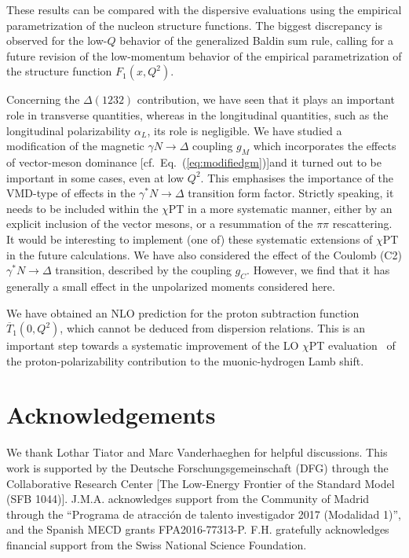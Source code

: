 \documentclass[12pt,preprint,tightenlines,
showpacs,preprintnumbers,amsmath,amssymb,
a4paper,nofootinbib]{revtex4-2}
\def\Eqref#1{Eq.~(\ref{eq:#1})}
\def\ol#1{\overline{#1}}
\begin{document}
These results can be compared with the dispersive evaluations using the  empirical parametrization of the nucleon structure functions. The biggest discrepancy is 
observed for the low-$Q$ behavior of the generalized Baldin sum rule, calling
for a future revision of the low-momentum behavior of the empirical
parametrization of the structure function $F_1(x,Q^2)$.


Concerning the $\Delta(1232)$ contribution, we have seen that it plays an important role in transverse quantities, whereas in the longitudinal quantities, such as the longitudinal polarizability $\alpha_L$, its role is negligible. We have studied a modification of the magnetic $\gamma N \to \Delta$ coupling $g_M$  which 
incorporates the effects of vector-meson dominance 
[cf.\ \Eqref{modifiedgm}]and it turned out to be important in some cases, even at low $Q^2$.
This emphasises the importance of the VMD-type of effects in the $\gamma^* N \to \Delta$ transition form factor.
Strictly speaking, it needs to be included within the $\chi$PT in a more systematic manner, either
by an explicit inclusion of the vector mesons, or a resummation of the $\pi\pi$ rescattering. It would be
interesting to implement (one of) these systematic extensions of $\chi$PT in the future calculations. 
We have also considered the effect of 
the Coulomb (C2) $\gamma^* N \to \Delta$ transition, described by the coupling $g_C$. However, we find that it has generally a small effect in the unpolarized moments considered here.


We have obtained an NLO prediction for the proton subtraction function $\ol{T}_1(0,Q^2)$, which cannot be deduced from dispersion relations. This is an important step towards a systematic
improvement of the LO $\chi$PT evaluation~\cite{Alarcon:2013cba} of the proton-polarizability contribution
to the muonic-hydrogen Lamb shift. 









\section*{Acknowledgements}

We thank Lothar Tiator and Marc Vanderhaeghen for helpful discussions. This work is supported by the Deutsche Forschungsgemeinschaft (DFG) through the
Collaborative Research Center [The Low-Energy Frontier of the Standard Model (SFB 1044)]. J.M.A. acknowledges support from the Community of Madrid through the ``Programa de atracci\'on de talento investigador 2017 (Modalidad 1)'', and the Spanish MECD grants FPA2016-77313-P. F.H. gratefully acknowledges financial support from the Swiss National Science Foundation.
\end{document}
